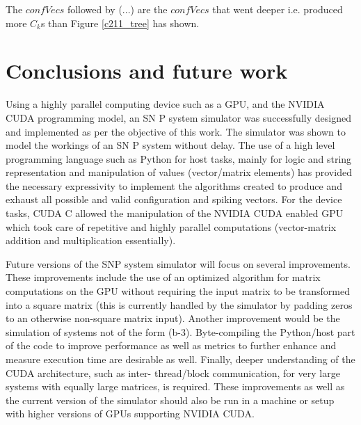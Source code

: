 \documentclass{svmultm}
\begin{document}
The $confVecs$ followed by (...) are the $confVecs$ that went deeper i.e. produced more $C_k$s than Figure \ref{c211_tree} has shown.


\section{Conclusions and future work}
Using a highly parallel computing device such as a  {GPU}, {and the}
 NVIDIA CUDA {programming model}, an SN P system simulator was
successfully designed and implemented as per the objective of this work. The simulator was shown to model the workings of an SN P system without delay. The use of a high
level programming language such as Python for host tasks,
mainly for logic and string representation and manipulation
of values (vector/matrix elements) {has} provided the necessary
expressivity to implement the algorithms created to produce
and exhaust all possible and valid configuration and spiking
vectors. For the device tasks, CUDA C allowed the
manipulation of the NVIDIA CUDA enabled  {GPU} which
took care of repetitive and highly parallel computations
({vector-matrix} addition and multiplication essentially).

Future versions of the SNP system simulator will focus on
several improvements. These improvements include the use
of an {optimized} algorithm for matrix computations {on the GPU} without requiring
the input matrix to be transformed into a square matrix (this is
currently handled by the simulator by padding zeros to an
otherwise non-square matrix input). Another improvement
would be the simulation of systems not of the form (b-3).
Byte-compiling the Python/host part of the code to improve
performance as well as metrics to further enhance and
measure execution time are desirable as well. Finally, deeper
understanding of the CUDA architecture, such as inter-
thread/block communication, for very large systems
with equally large matrices, is required. These
improvements as well as the current version of the simulator
should also be run in a machine or setup with higher versions of
 {GPUs} {supporting} NVIDIA CUDA.


\end{document}
